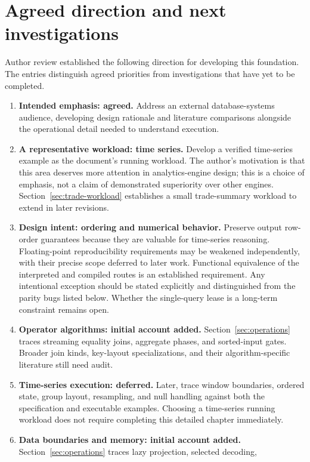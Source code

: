 \documentclass[11pt,a4paper]{article}
\begin{document}
\section{Agreed direction and next investigations}
Author review established the following direction for developing this
foundation. The entries distinguish agreed priorities from investigations
that have yet to be completed.
\begin{enumerate}
  \item \textbf{Intended emphasis: agreed.} Address an external
    database-systems audience, developing design rationale and literature
    comparisons alongside the operational detail needed to understand
    execution.
  \item \textbf{A representative workload: time series.} Develop a verified
    time-series example as the document's running workload. The author's
    motivation is that this area deserves more attention in analytics-engine
    design; this is a choice of emphasis, not a claim of demonstrated
    superiority over other engines. Section~\ref{sec:trade-workload} establishes
    a small trade-summary workload to extend in later revisions.
  \item \textbf{Design intent: ordering and numerical behavior.} Preserve
    output row-order guarantees because they are valuable for time-series
    reasoning. Floating-point reproducibility requirements may be weakened
    independently, with their precise scope deferred to later work.
    Functional equivalence of the interpreted and compiled routes is an
    established requirement. Any intentional exception should be stated
    explicitly and distinguished from the parity bugs listed below. Whether
    the single-query lease is a long-term constraint remains open.
  \item \textbf{Operator algorithms: initial account added.}
    Section~\ref{sec:operations} traces streaming equality joins, aggregate
    phases, and sorted-input gates. Broader join kinds, key-layout
    specializations, and their algorithm-specific literature still need audit.
  \item \textbf{Time-series execution: deferred.} Later, trace window boundaries, ordered state,
    group layout, resampling, and null handling against both the specification
    and executable examples. Choosing a time-series running workload does
    not require completing this detailed chapter immediately.
  \item \textbf{Data boundaries and memory: initial account added.}
    Section~\ref{sec:operations} traces lazy projection, selected decoding,

\end{enumerate}
\end{document}
